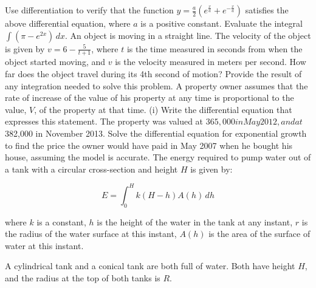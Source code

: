 \documentclass[12pt,addpoints]{exam}
\begin{document}
\begin{questions}
Use differentiation to verify that the function \( y = \frac{a}{2} \left( e^{\frac{x}{a}} + e^{-\frac{x}{a}} \right) \) satisfies the above differential equation, where \( a \) is a positive constant.
\fillwithlines{5cm}
\question[5] Evaluate the integral \(\int (\pi - e^{2x}) \, dx\).
\fillwithlines{5cm}
\question[5] An object is moving in a straight line. The velocity of the object is given by \(v = 6 - \frac{5}{t+1}\), where \(t\) is the time measured in seconds from when the object started moving, and \(v\) is the velocity measured in meters per second. How far does the object travel during its 4th second of motion? Provide the result of any integration needed to solve this problem.
\fillwithlines{5cm}
\question[5] A property owner assumes that the rate of increase of the value of his property at any time is proportional to the value, \( V \), of the property at that time. (i) Write the differential equation that expresses this statement.
\fillwithlines{5cm}
\question[5] The property was valued at $365,000 in May 2012, and at $382,000 in November 2013. Solve the differential equation for exponential growth to find the price the owner would have paid in May 2007 when he bought his house, assuming the model is accurate.
\fillwithlines{5cm}
\question[5] The energy required to pump water out of a tank with a circular cross-section and height \( H \) is given by:

\[ 
E = \int_0^H k(H-h)A(h) \, dh 
\]

where  
\( k \) is a constant,  
\( h \) is the height of the water in the tank at any instant,  
\( r \) is the radius of the water surface at this instant,  
\( A(h) \) is the area of the surface of water at this instant.

A cylindrical tank and a conical tank are both full of water. Both have height \( H \), and the radius at the top of both tanks is \( R \).


\end{questions}
\end{document}
